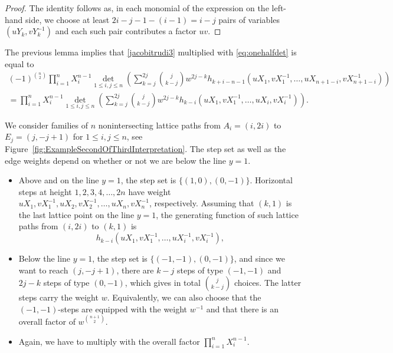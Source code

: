 \documentclass[12pt]{amsart}
\theoremstyle{definition}
\numberwithin{equation}{section}
\begin{document}
\begin{proof}
	The identity follows as, in each monomial of the expression on the left-hand side, we choose at least 
	$2i-j-1-(i-1)=i-j$ pairs of variables $(u Y_k, v Y_k^{-1})$ and each such pair contributes a factor $u v$. 
\end{proof} 

The previous lemma implies that \eqref{jacobitrudi3} multiplied with \eqref{eq:onehalfdet} is equal to 
\begin{multline}
	\label{jacobitrudi4} 
	(-1)^{\binom{n}{2}}\prod_{i=1}^n X_i^{n-1} \det_{1 \le i,j \le n} \left(  \sum_{k=j}^{2j} \binom{j}{k-j} w^{2j-k} 
	h_{k+i-n-1}(u X_{1},v X_{1}^{-1},\ldots,u X_{n+1-i},v X_{n+1-i}^{-1}) \right) \\
	= \prod_{i=1}^n X_i^{n-1} \det_{1 \le i,j \le n} \left(  \sum_{k=j}^{2j} \binom{j}{k-j} w^{2j-k} 
	h_{k-i}(u X_{1},v X_{1}^{-1},\ldots,u X_{i},v X_{i}^{-1}) \right).
\end{multline} 

We consider families of $n$ nonintersecting lattice paths from $A_i=(i,2i)$ to $E_j=(j,-j+1)$ for $1 \le i,j \le n$, see Figure~\ref{fig:ExampleSecondOfThirdInterpretation}. The step set as well as the edge weights depend on whether or not we are below the line $y=1$. 
\begin{itemize} 
	\item Above and on the line $y=1$, the step set is $\{(1,0),(0,-1)\}$. Horizontal steps at height 
	$1,2,3,4,\ldots,2n$ have weight $u X_1, v X_1^{-1},u X_{2}, v X_{2}^{-1},\ldots, u X_n, 
	v X_n^{-1}$, respectively.  Assuming that $(k,1)$ is the last lattice point on the line $y=1$, the generating function of such lattice paths from 
	$(i,2i)$ to $(k,1)$ is 
	\begin{equation*}
		h_{k-i}(u X_{1},v X_{1}^{-1},\ldots,u X_i^{-1},v X_i^{-1}),
	\end{equation*} 
	\item Below the line $y=1$, the step set is $\{(-1,-1),(0,-1)\}$, and since we want to reach $(j,-j+1)$, there are $k-j$ steps of type $(-1,-1)$ and $2j-k$ steps of type $(0,-1)$, which gives in total $\binom{j}{k-j}$ choices. The latter steps carry the weight $w$. Equivalently, we can also choose that the $(-1,-1)$-steps are equipped with the weight $w^{-1}$ and that there is an overall factor of $w^{\binom{n+1}{2}}$.
	\item Again, we have to multiply with the overall factor $\prod_{i=1}^n X_i^{n-1}$.  
\end{itemize} 
\end{document}
